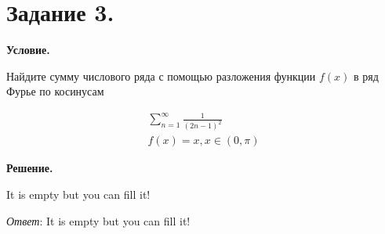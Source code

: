 \section{Задание 3.}

\textbf{Условие.}

Найдите сумму числового ряда с помощью разложения функции $f(x)$ в ряд Фурье по косинусам

\begin{gather*}
    \sum_{n = 1}^\infty \frac{1}{(2n - 1)^2} \\
    f(x) = x, x \in (0, \pi)
\end{gather*}

\vspace{10mm}

\textbf{Решение.}

It is empty but you can fill it!

\textit{Ответ}:  It is empty but you can fill it!

\clearpage
